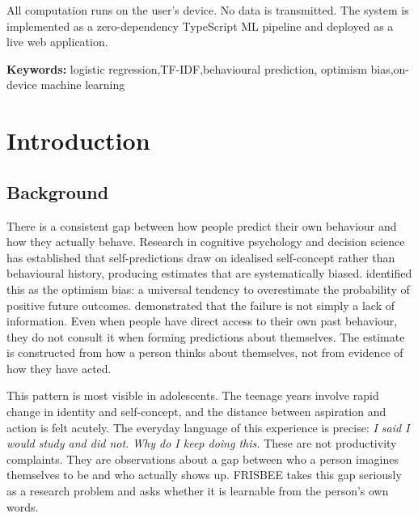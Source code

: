 \documentclass[11pt, a4paper]{report}
\begin{document}
All computation runs on the user's device. No data is transmitted.
The system is implemented as a zero-dependency TypeScript ML pipeline
and deployed as a live web application.

\vspace{0.6cm}
\noindent\textbf{Keywords:}\enspace
logistic regression,\enspace TF-IDF,\enspace behavioural prediction,\enspace
optimism bias,\enspace on-device machine learning

\newpage
\tableofcontents

\newpage
\listoffigures

\newpage
\listoftables

\newpage
\pagestyle{fancy}
\setcounter{page}{1}

\chapter{Introduction}

\section{Background}

There is a consistent gap between how people predict their own behaviour and
how they actually behave. Research in cognitive psychology and decision science
has established that self-predictions draw on idealised self-concept rather
than behavioural history, producing estimates that are systematically biased.
\citet{sharot2011} identified this as the optimism bias: a universal tendency
to overestimate the probability of positive future outcomes. \citet{dunning2004}
demonstrated that the failure is not simply a lack of information. Even when
people have direct access to their own past behaviour, they do not consult it
when forming predictions about themselves. The estimate is constructed from
how a person thinks about themselves, not from evidence of how they have acted.

This pattern is most visible in adolescents. The teenage years involve rapid
change in identity and self-concept, and the distance between aspiration and
action is felt acutely. The everyday language of this experience is precise:
\textit{I said I would study and did not.} \textit{Why do I keep doing this.}
These are not productivity complaints. They are observations about a gap
between who a person imagines themselves to be and who actually shows up.
FRISBEE takes this gap seriously as a research problem and asks whether it
is learnable from the person's own words.
\end{document}
